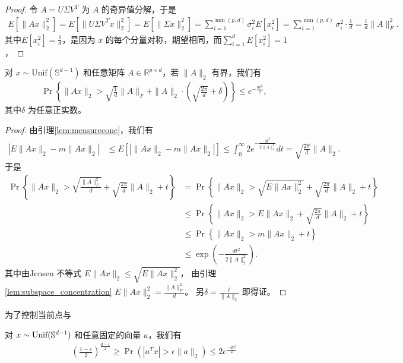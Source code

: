 \documentclass[main]{subfiles}
\begin{document}
\begin{proof}
令 $A = U \Sigma V^T$ 为 $A$ 的奇异值分解，于是
\begin{align*}
  E[\|Ax\|_2^2] = E[\|U \Sigma V^T x\|_2^2] 
  = E[\|\Sigma x\|_2^2] = \sum_{i=1}^{\min(p,d)} \sigma_i^2 E[x_i^2] 
  = \sum_{i=1}^{\min(p,d)} \sigma_i^2 \cdot \frac{1}{d} = \frac{1}{d} \|A\|_F^2.
\end{align*}
其中$ E[x_i^2] = \frac{1}{d}$，是因为 $x$ 的每个分量对称，期望相同，而$ \sum_{i=1}^d E[x_i^2] = 1 $，
\end{proof}

\begin{lemma} \label{lem:subspace_concentration}
  对 $x \sim \text{Unif}(\mathbb{S}^{d-1})$ 和任意矩阵 
  $A \in \mathbb{R}^{p \times d}$，若 $\|A\|_2$ 有界，我们有
  \begin{align*}
    \Pr \left\{ \|A x\|_2 > \sqrt{\frac{1}{d}} \|A\|_F + 
    \|A\|_2 \cdot \left( \sqrt{\frac{2\pi}{d}} + \delta \right) \right\}
    \le e^{-\frac{d \delta^2}{2}},
  \end{align*}
  其中$\delta$ 为任意正实数。
\end{lemma}

\begin{proof}
  由引理\ref{lem:measureconc}，我们有
  \begin{align*}
    \left| E\|A x\|_2 - m\|A x\|_2 \right| &\le E\left[ \left| \|A x\|_2 - m\|A x\|_2 \right| \right] \le \int_0^\infty 2e^{-\frac{dt^2}{2\|A\|_2^2}} dt = \sqrt{\frac{2\pi}{d}} \|A\|_2.
  \end{align*}
  于是
  \begin{align*}
    \Pr \left\{ \|A x\|_2 > \sqrt{\frac{\|A\|_F^2}{d}} + \sqrt{\frac{2\pi}{d}} \|A\|_2 + t \right\}
    &= \Pr \left\{ \|A x\|_2 > \sqrt{E\|A x\|_2^2} + \sqrt{\frac{2\pi}{d}} \|A\|_2 + t \right\} \\
    &\le \Pr \left\{ \|A x\|_2 > E\|A x\|_2 + \sqrt{\frac{2\pi}{d}} \|A\|_2 + t \right\} \\
    &\le \Pr \left\{ \|A x\|_2 > m\|A x\|_2 + t \right\} \\
    &\le \exp \left( -\frac{dt^2}{2 \|A\|_2^2} \right).
  \end{align*}
  其中由Jensen 不等式 $ E\|A x\|_2 \le \sqrt{E\|Ax\|_2^2}$，
  由引理\ref{lem:subspace_concentration} $E \|Ax\|_2^2=\frac{\|A\|_F^2}{d}$。
  另$\delta = \frac{t}{\|A\|_2}$ 即得证。
\end{proof}

为了控制当前点与
\begin{lemma}\label{lem:spherical_cap}
  对 $x \sim \text{Unif}(\S^{d-1})$ 和任意固定的向量 $a$，我们有
  \begin{align*}
    \left( \frac{1-\varepsilon}{2} \right)^{\frac{d-1}{2}} \ge
    \Pr\left(|a^Tx|>\epsilon \|a\|_2\right) \leq 2e^{\frac{-d\epsilon^2}{2}}
  \end{align*}
\end{lemma}
\end{document}
